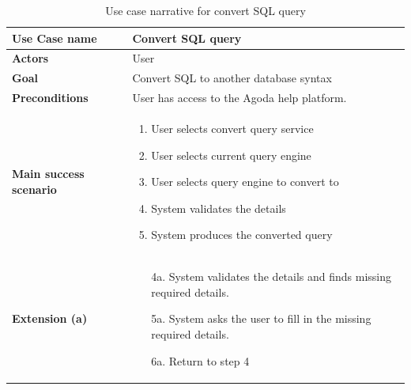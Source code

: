     \begin{table}[H]
        \centering
        \caption{Use case narrative for convert SQL query}
        \label{tbl:use-case-convert-sql}
        \begin{tabular}{|p{4cm}|p{10cm}|}
        \hline
        \textbf{Use Case name} & Convert SQL query \\ \hline
        \textbf{Actors} & User \\ \hline
        \textbf{Goal} & Convert SQL to another database syntax \\ \hline
        \textbf{Preconditions} & User has access to the Agoda help platform. \\ \hline
        \textbf{Main success scenario} & 
        \begin{enumerate}
            \item User selects convert query service
            \item User selects current query engine
            \item User selects query engine to convert to
            \item System validates the details
            \item System produces the converted query
        \end{enumerate}
        \\ \hline
        \textbf{Extension (a)} & 
        \begin{enumerate}
            \item[4a.] System validates the details and finds missing required details.
            \item[5a.] System asks the user to fill in the missing required details.
            \item[6a.] Return to step 4
        \end{enumerate}
        \\ \hline
        \end{tabular}
    \end{table}

